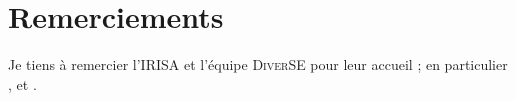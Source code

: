\section*{Remerciements}

\begin{flushright}
Je tiens à remercier l'\textsc{IRISA} et l'équipe \textsc{DiverSE} pour leur accueil ; en particulier \johann, \paco et \inti.
\end{flushright}
